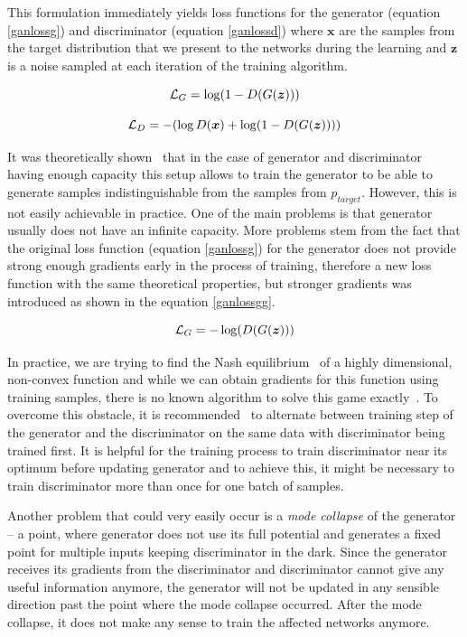This formulation immediately yields loss functions for the generator (equation \ref{ganlossg}) and discriminator (equation \ref{ganlossd}) where $\bm{x}$ are the samples from the target distribution that we present to the networks during the learning and $\bm{z}$ is a noise sampled at each iteration of the training algorithm.

\begin{equation}
\mathcal{L}_G = \log(1 - D(G(\bm{z})))
\label{ganlossg}
\end{equation}

\begin{equation}
\mathcal{L}_D = - (\log D(\bm{x}) + \log(1 - D(G(\bm{z}))))
\label{ganlossd}
\end{equation}

It was theoretically shown~\cite{origgan} that in the case of generator and discriminator having enough capacity this setup allows to train the generator to be able to generate samples indistinguishable from the samples from $p_{target}$. However, this is not easily achievable in practice. One of the main problems is that generator usually does not have an infinite capacity. More problems stem from the fact that the original loss function (equation \ref{ganlossg}) for the generator does not provide strong enough gradients early in the process of training, therefore a new loss function with the same theoretical properties, but stronger gradients was introduced as shown in the equation \ref{ganlossgg}.

\begin{equation}
\mathcal{L}_G = -\log(D(G(\bm{z})))
\label{ganlossgg}
\end{equation}

In practice, we are trying to find the Nash equilibrium~\cite{nash} of a highly dimensional, non-convex function and while we can obtain gradients for this function using training samples, there is no known algorithm to solve this game exactly~\cite{improvedgan}. To overcome this obstacle, it is recommended~\cite{origgan} to alternate between training step of the generator and the discriminator on the same data with discriminator being trained first. It is helpful for the training process to train discriminator near its optimum before updating generator and to achieve this, it might be necessary to train discriminator more than once for one batch of samples.

Another problem that could very easily occur is a {\em mode collapse} of the generator -- a point, where generator does not use its full potential and generates a fixed point for multiple inputs keeping discriminator in the dark. Since the generator receives its gradients from the discriminator and discriminator cannot give any useful information anymore, the generator will not be updated in any sensible direction past the point where the mode collapse occurred. After the mode collapse, it does not make any sense to train the affected networks anymore.

